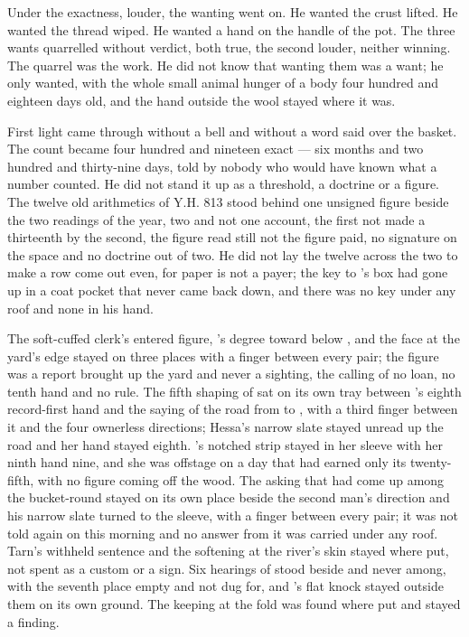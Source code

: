 Under the exactness, louder, the wanting went on. He wanted the crust lifted. He wanted the thread wiped. He wanted a hand on the handle of the pot. The three wants quarrelled without verdict, both true, the second louder, neither winning. The quarrel was the work. He did not know that wanting them was a want; he only wanted, with the whole small animal hunger of a body four hundred and eighteen days old, and the hand outside the wool stayed where it was.

First light came through  without a bell and without a word said over the basket. The count became four hundred and nineteen exact --- six months and two hundred and thirty-nine days, told by nobody who would have known what a number counted. He did not stand it up as a threshold, a doctrine or a figure. The twelve old arithmetics of Y.H. 813 stood behind one unsigned figure beside the two readings of the year, two and not one account, the first not made a thirteenth by the second, the figure read still not the figure paid, no signature on the space and no doctrine out of two. He did not lay the twelve across the two to make a row come out even, for paper is not a payer; the key to 's box had gone up  in a coat pocket that never came back down, and there was no key under any roof and none in his hand.

The soft-cuffed clerk's entered figure, 's degree toward  below , and the face at the yard's edge stayed on three places with a finger between every pair; the figure was a report brought up the yard and never a sighting, the calling of no loan, no tenth hand and no rule. The fifth shaping of  sat on its own tray between 's eighth record-first hand and the saying of the road from  to , with a third finger between it and the four ownerless directions; Hessa's narrow slate stayed unread up the road and her hand stayed eighth. 's notched strip stayed in her sleeve with her ninth hand nine, and she was offstage on a day that had earned only its twenty-fifth, with no figure coming off the wood. The asking that had come up among the bucket-round stayed on its own place beside the second man's direction and his narrow slate turned to the sleeve, with a finger between every pair; it was not told again on this morning and no answer from it was carried under any roof. Tarn's withheld sentence and the softening at the river's skin stayed where put, not spent as a custom or a sign. Six hearings of  stood beside and never among, with the seventh place empty and not dug for, and 's flat knock stayed outside them on its own ground. The keeping at the fold was found where put and stayed a finding.

